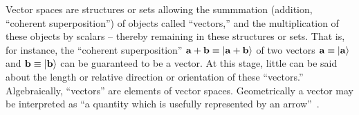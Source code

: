 Vector spaces are structures or sets  allowing the
summmation (addition,  ``coherent superposition'') of objects called ``vectors,'' and the multiplication
of these objects by scalars --  thereby remaining in these structures or sets.
That is, for instance, the ``coherent superposition''  ${\bf a} + {\bf b}\equiv \vert {\bf a} + {\bf b} \rangle $
of two vectors ${\bf a} \equiv \vert {\bf a} \rangle $ and ${\bf b} \equiv \vert {\bf b} \rangle $ can be guaranteed to
be a vector.
At this stage, little can be said about the length or relative direction or orientation of these ``vectors.''
Algebraically, ``vectors'' are elements of vector spaces.
Geometrically a vector may be interpreted as ``a quantity which is usefully represented by an arrow''~\cite{Weinreich}.



